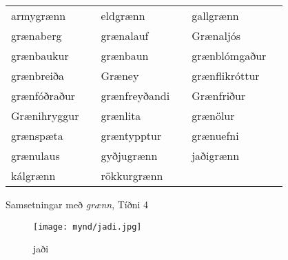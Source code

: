 \documentclass[../samsetningasafn.tex]{subfiles}
\begin{document}
\begin{wordlist}[H]
\begin{tcolorbox}
	\setlength{\extrarowheight}{3pt}
	\begin{tabular}{BlBlBl}	
		armygrænn		& 	\phantom{baa}	& 		
		eldgrænn		& 	\phantom{baa}	& 		
		gallgrænn		& 	\phantom{baa}	\\ 		
		grænaberg		& 		& 		
		grænalauf		& 		& 		
		Grænaljós		& 		\\ 		
		grænbaukur		& 		& 		
		grænbaun		& 		& 		
		grænblómgaður 	& 		\\ 		
		grænbreiða		& 		& 		
		Græney			& 		& 		
		grænflikróttur	& 		\\ 	
		grænfóðraður	& 		& 	
		grænfreyðandi	&		& 	
		Grænfriður		& 		\\ 		
		Grænihryggur	&		& 	
		grænlita			&		& 		
		grænölur		&		\\ 		
		grænspæta		&		& 	
		græntypptur		&		& 		
		grænuefni		&		\\ 		
		grænulaus		&		& 		
		gyðjugrænn		&		& 		
		jaðigrænn		&		\\ 		
		kálgrænn		& 		& 		
		rökkurgrænn		&		& 	
						&
	\end{tabular}

\end{tcolorbox}
	\caption{Samsetningar með \textit{grænn}, Tíðni 4}
	\label{listi:graent.4}
\end{wordlist}

\begin{figure}[H]
\begin{tcolorbox}
\centering
	\texttt{[image: mynd/jadi.jpg]}
\end{tcolorbox}
	\caption{jaði}
	\label{mynd:jadi}
\end{figure}
\end{document}
